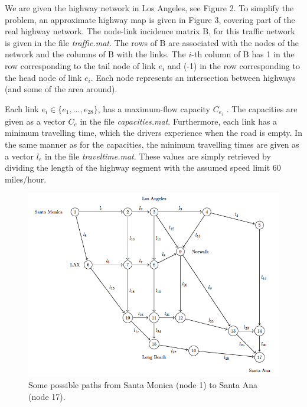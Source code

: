 \documentclass[
	12pt, %
]{fphw}
\begin{document}
We are given the highway network in Los Angeles, see Figure 2. To simplify the problem, an approximate highway map is given in Figure 3, covering part of the real highway network. The node-link incidence matrix B, for this traffic network is given in the file \emph{traffic.mat}.
The rows of B are associated with the nodes of the network and the columns of B with the links.
The $i$-th column of B has 1 in the row corresponding to the tail node of link $e_i$ and (-1) in the row corresponding to the head node of link $e_i$. Each node represents an intersection between highways (and some of the area around).
\vspace{10pt}

Each link $e_i \in \{e_1, . . . ,e_{28}\}$, has a maximum-flow capacity $C_{e_i}$ . The capacities are given as a vector $C_e$ in the file \emph{capacities.mat}. Furthermore, each link has a minimum travelling time,
which the drivers experience when the road is empty. In the same manner as for the capacities, the minimum travelling times are given as a vector $l_e$ in the file \emph{traveltime.mat}. These values are simply retrieved by dividing the length of the highway segment with the assumed speed limit 60 miles/hour.


\begin{figure}[H]
	\includegraphics[width=0.8\columnwidth]{graphEx2.png} %
	\caption{Some possible paths from Santa Monica (node 1) to Santa Ana (node 17).}
	\label{fig:graphEx3}
\end{figure}
\end{document}
